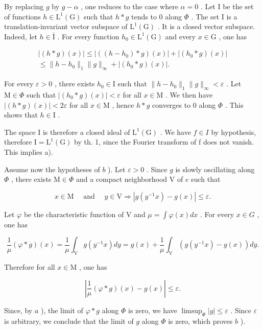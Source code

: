 By replacing \(g\) by \(g - \alpha\) , one reduces to the case where \(\alpha = 0\) . Let I be the set of functions \(h \in \mathrm{L}^1(\mathrm{G})\) such that \(h*g\) tends to 0 along \(\Phi\) . The set I is a translation-invariant vector subspace of \(\mathrm{L}^1(\mathrm{G})\) . It is a closed vector subspace. Indeed, let \(h \in \bar{\mathrm{I}}\) . For every function \(h_0 \in \mathrm{L}^1(\mathrm{G})\) and every \(x \in \mathrm{G}\) , one has

\[
\begin{array}{c} | (h * g) (x) | \leqslant | ((h - h _ {0}) * g) (x) | + | (h _ {0} * g) (x) | \\ \leqslant \| h - h _ {0} \| _ {1} \| g \| _ {\infty} + | (h _ {0} * g) (x) |. \end{array}
\]

For every \(\varepsilon > 0\) , there exists \(h_0 \in \mathrm{I}\) such that \(\|h - h_0\|_1 \|g\|_\infty < \varepsilon\) . Let \(\mathrm{M} \in \Phi\) such that \(|(h_0 * g)(x)| < \varepsilon\) for all \(x \in \mathrm{M}\) . We then have \(|(h * g)(x)| < 2\varepsilon\) for all \(x \in \mathrm{M}\) , hence \(h * g\) converges to 0 along \(\Phi\) . This shows that \(h \in \mathrm{I}\) .

The space I is therefore a closed ideal of \(\mathrm{L}^{1}(\mathrm{G})\) . We have \(f \in I\) by hypothesis, therefore \(\mathrm{I} = \mathrm{L}^{1}(\mathrm{G})\) by th. 1, since the Fourier transform of f does not vanish. This implies a).

Assume now the hypotheses of \(b\) ). Let \(\varepsilon > 0\) . Since \(g\) is slowly oscillating along \(\Phi\) , there exists \(\mathrm{M} \in \Phi\) and a compact neighborhood \(\mathrm{V}\) of \(e\) such that

\[
 x \in \mathrm{M} \quad \text { and } \quad y \in \mathrm{V} \Longrightarrow | g (y ^ {- 1} x) - g (x) | \leqslant \varepsilon .
\]

Let \(\varphi\) be the characteristic function of V and \(\mu = \int \varphi(x)dx\) . For every \(x \in G\) , one has

\[
\frac {1}{\mu} (\varphi * g) (x) = \frac {1}{\mu} \int_ {\mathrm{V}} g (y ^ {- 1} x) d y = g (x) + \frac {1}{\mu} \int_ {\mathrm{V}} (g (y ^ {- 1} x) - g (x)) d y.
\]

Therefore for all \(x \in \mathrm{M}\) , one has

\[
\left| \frac {1}{\mu} (\varphi * g) (x) - g (x) \right| \leqslant \varepsilon .
\]

Since, by \(a\) ), the limit of \(\varphi * g\) along \(\Phi\) is zero, we have \(\limsup_{\Phi} |g| \leqslant \varepsilon\) . Since \(\varepsilon\) is arbitrary, we conclude that the limit of \(g\) along \(\Phi\) is zero, which proves \(b\) ).

